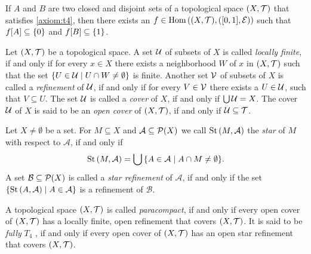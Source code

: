 \begin{lemma} \label{lemma:urysohn} 
	If $A$ and $B$ are two closed and disjoint sets of a topological space $\tspace$ that satisfies \ref{axiom:t4}, then there exists an $f \in \Hom\pbraces{\tspace, \eucl}$ such that $f\bbraces{A} \subseteq \{0\}$ and $f\bbraces{B} \subseteq \{1\}$. 
\end{lemma}


\begin{definition}
	Let $\tspace$ be a topological space. A set $\cover$ of subsets of $X$ is called \textit{locally finite}, if and only if for every $x \in X$ there exists a neighborhood $W$ of $x$ in $\tspace$ such that the set $\Bbraces{U \in \cover\mid U \cap W \neq \emptyset}$ is finite. Another set $\cover[V]$ of subsets of $X$ is called a \textit{refinement} of $\cover$, if and only if for every $V \in \cover[V]$ there exists a $U \in \cover$, such that $V \subseteq U$. The set $\cover$ is called a \textit{cover} of $X$, if and only if $\bigcup \cover = X$. The cover $\cover$ of $X$ is said to be an \textit{open cover} of $\tspace$, if and only if $\cover \subseteq \mathcal{T}$. 
\end{definition}

\begin{definition}
	Let $X \neq \emptyset$ be a set. For $M \subseteq X$ and $\cover[A] \subseteq \powset$ we call $\St\pbraces{M, \cover[A]}$ the \textit{star} of $M$ with respect to $\mathcal{A}$, if and only if 
	\begin{align*}
	\St\pbraces{M, \mathcal{A}} = \bigcup \Bbraces{A \in \mathcal{A} \mid A \cap M \neq \emptyset}.
	\end{align*}
	A set $\mathcal{B} \subseteq \powset$ is called a \textit{star refinement} of $\mathcal{A}$, if and only if the set $\Bbraces{\St\pbraces{A, \mathcal{A}} \mid A \in \mathcal{A}}$ is a refinement of $\mathcal{B}$. 
\end{definition}

\begin{definition}
	A topological space $\tspace$ is called \textit{paracompact}, if and only if every open cover of $\tspace$ has a locally finite, open refinement that covers $\tspace$. It is said to be \textit{fully} $T_4$ , if and only if every open cover of $\tspace$ has an open star refinement that covers $\tspace$. 
\end{definition}

